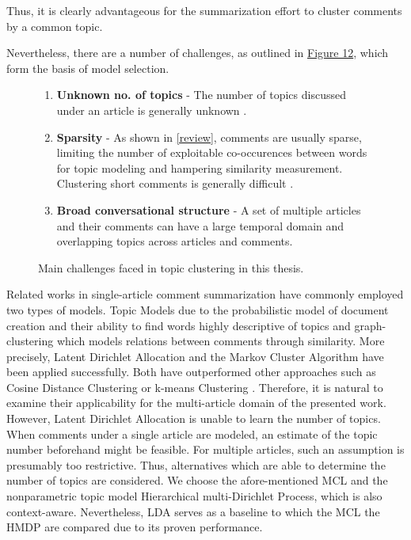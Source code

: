 Thus, it is clearly advantageous for the summarization effort to cluster comments by a common topic. \par
Nevertheless, there are a number of challenges, as outlined in \hyperref[challenges]{Figure 12}, which form the basis of model selection.
\begin{figure}[H]
\label{challenges}
\begin{mdframed}[nobreak=true,align=center,userdefinedwidth=\textwidth]
\begin{enumerate}
\item \textbf{Unknown no. of topics} - The number of topics discussed under an article is generally unknown \cite{DBLP:conf/ecir/AkerKBPBHG16}.
\item \textbf{Sparsity} - As shown in \autoref{review}, comments are usually sparse, limiting the number of exploitable co-occurences between words for topic modeling \cite{DBLP:journals/tacl/NguyenBDJ15} and hampering similarity measurement. Clustering short comments is generally difficult \cite{DBLP:conf/ecir/AkerKBPBHG16}.
\item \textbf{Broad conversational structure} - A set of multiple articles and their comments can have a large temporal domain and overlapping topics across articles and comments.
\end{enumerate}
\end{mdframed}
\caption{Main challenges faced in topic clustering in this thesis.}
\end{figure}
\noindent
Related works in single-article comment summarization have commonly employed two types of models. Topic Models due to the probabilistic model of document creation and their ability to find words highly descriptive of topics and graph-clustering which models relations between comments through similarity. More precisely, Latent Dirichlet Allocation \cite{DBLP:conf/icwsm/KhabiriCH11, DBLP:conf/cikm/MaSYC12, llewellyn_grover_oberlander, DBLP:conf/ecir/AkerKBPBHG16} and the Markov Cluster Algorithm \cite{DBLP:conf/ecir/AkerKBPBHG16} have been applied successfully. Both have outperformed other approaches such as Cosine Distance Clustering \cite{llewellyn_grover_oberlander} or k-means Clustering \cite{llewellyn_grover_oberlander, DBLP:conf/icwsm/KhabiriCH11}. Therefore, it is natural to examine their applicability for the multi-article domain of the presented work.
However, Latent Dirichlet Allocation is unable to learn the number of topics. When comments under a single article are modeled, an estimate of the topic number beforehand might be feasible. For multiple articles, such an assumption is presumably too restrictive. Thus, alternatives which are able to determine the number of topics are considered. We choose the afore-mentioned MCL and the nonparametric topic model Hierarchical multi-Dirichlet Process, which is also context-aware. Nevertheless, LDA serves as a baseline to which the MCL the HMDP are compared due to its proven performance. \par

